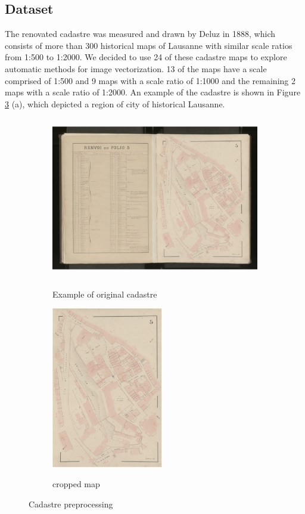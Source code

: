 \documentclass[12pt]{article}
\begin{document}
\subsection{Dataset}
The renovated cadastre was measured and drawn by Deluz in 1888, which consists of more than 300 historical maps of Lausanne with similar scale ratios from 1:500 to 1:2000. We decided to use 24 of these cadastre maps to explore automatic methods for image vectorization. 13 of the maps have a scale comprised of 1:500 and 9 maps with a scale ratio of 1:1000 and the remaining 2 maps with a scale ratio of 1:2000. An example of the cadastre is shown in Figure \ref{fig:cadaster-preprocessing} (a), which depicted a region of city of historical Lausanne.   
\begin{figure}[H]
	\begin{subfigure}[b]{.66\textwidth}
		\centering
		\includegraphics[height=200pt]{images/original.jpg}  
		\label{fig:original-images}
		\caption{Example of original cadastre}
	\end{subfigure}
	\begin{subfigure}[b]{.33\textwidth}
		\centering
		\includegraphics[height=200pt]{images/img1.png}  
		\label{fig:cropped-images}
		\caption{cropped map}
	\end{subfigure}
	
	\caption{Cadastre preprocessing}
	\label{fig:cadaster-preprocessing}
\end{figure}
\end{document}
